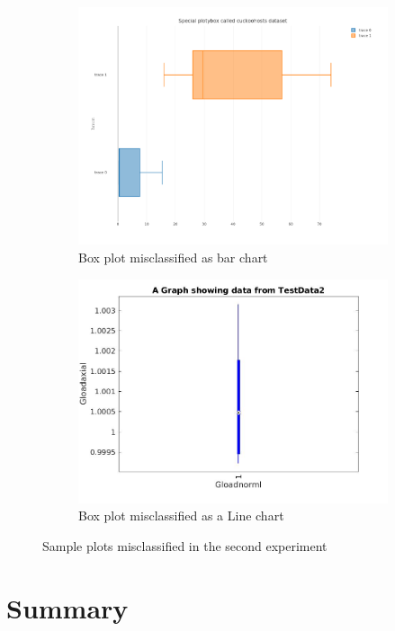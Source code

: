 \documentclass[12pt, a4paper,oneside]{report}
\begin{document}
\begin{figure}[!htb]
	\begin{subfigure}{.6\textwidth}
		\centering
		\includegraphics[width=.8\linewidth]{missybar.png}
		\caption{Box plot misclassified as bar chart}
		\label{fig:mis1}
	\end{subfigure}%
	\begin{subfigure}{.5\textwidth}
		\centering
		\includegraphics[width=1.0\linewidth]{missyline.jpg}
		\caption{Box plot misclassified as a Line chart}
		\label{fig:mis2}
	\end{subfigure}
	\caption{Sample plots misclassified in the second experiment}
	\label{fig:missrand2}
\end{figure}

\chapter{Summary}



\end{document}
